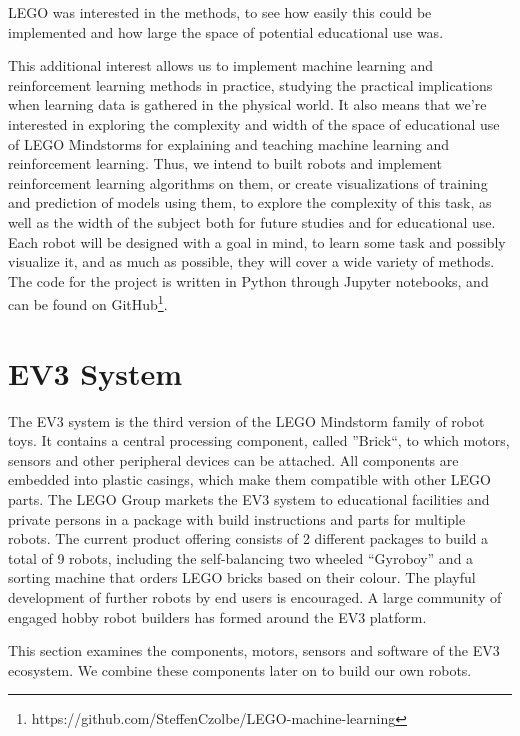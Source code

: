 \documentclass[11pt, a4paper]{article}
\begin{document}
LEGO was interested in the methods, to see how easily this could be implemented and how large the space of potential educational use was.

This additional interest allows us to implement machine learning and reinforcement learning methods in practice, studying the practical implications when learning data is gathered in the physical world. It also means that we're interested in exploring the complexity and width of the space of educational use of LEGO Mindstorms for explaining and teaching machine learning and reinforcement learning. Thus, we intend to built robots and implement reinforcement learning algorithms on them, or create visualizations of training and prediction of models using them, to explore the complexity of this task, as well as the width of the subject both for future studies and for educational use. Each robot will be designed with a goal in mind, to learn some task and possibly visualize it, and as much as possible, they will cover a wide variety of methods. The code for the project is written in Python through Jupyter notebooks, and can be found on GitHub\footnote{https://github.com/SteffenCzolbe/LEGO-machine-learning}.

\section{EV3 System}
The EV3 system is the third version of the LEGO Mindstorm family of robot toys. It contains a central processing component, called ''Brick``, to which motors, sensors and other peripheral devices can be attached. All components are embedded into plastic casings, which make them compatible with other LEGO parts. The LEGO Group markets the EV3 system to educational facilities and private persons in a package with build instructions and parts for multiple robots. The current product offering consists of 2 different packages to build a total of 9 robots, including the self-balancing two wheeled ``Gyroboy'' and a sorting machine that orders LEGO bricks based on their colour. The playful development of further robots by end users is encouraged. A large community of engaged hobby robot builders has formed around the EV3 platform.

This section examines the components, motors, sensors and software of the EV3 ecosystem. We combine these components later on to build our own robots.
\end{document}
